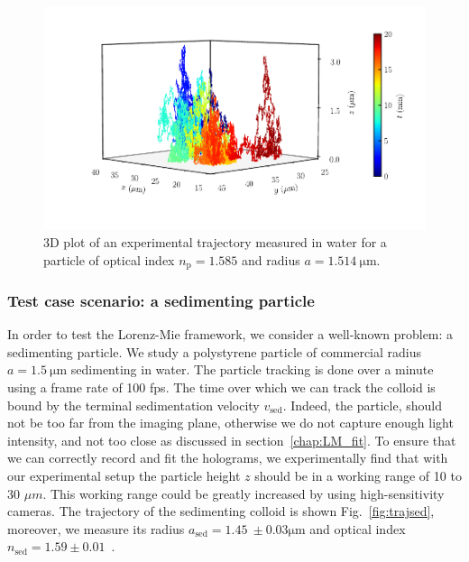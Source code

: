 \begin{figure}[H]
	\centering
	\includegraphics{02_body/chapter2/images/trajectory/traj.pdf}
	\caption{3D plot of an experimental trajectory measured in water for a particle of optical index $n_\mathrm{p} = 1.585$ and radius $a = 1.514  ~ \mathrm{\mu m}$.~\href{https://github.com/eXpensia/Confined-Brownian-Motion/blob/main/02_body/chapter2/images/trajectory/graph_ploting.ipynb}{\faGithub}}
	\label{fig:3dtrajec}
\end{figure}

\subsubsection{Test case scenario: a sedimenting particle}

In order to test the Lorenz-Mie framework, we consider a well-known problem: a sedimenting particle. We study a polystyrene particle of commercial radius $a = 1.5 ~ \mathrm{\mu m}$ sedimenting in water. The particle tracking is done over a minute using a frame rate of 100 \gls{fps}. The time over which we can track the colloid is bound by the terminal sedimentation velocity $v_\mathrm{sed}$. Indeed, the particle, should not be too far from the imaging plane, otherwise we do not capture enough light intensity, and not too close as discussed in section~\ref{chap:LM_fit}. To ensure that we can correctly record and fit the holograms, we experimentally find that with our experimental setup the particle height $z$ should be in a working range of 10 to 30 $\mu m$. This working range could be greatly increased by using high-sensitivity cameras. The trajectory of the sedimenting colloid is shown Fig.~\ref{fig:trajsed}, moreover, we measure its radius $a_\mathrm{sed} = 1.45 ~ \pm 0.03 \mathrm{\mu m}$ and optical index $n_\mathrm{sed} = 1.59 \pm 0.01$~.


